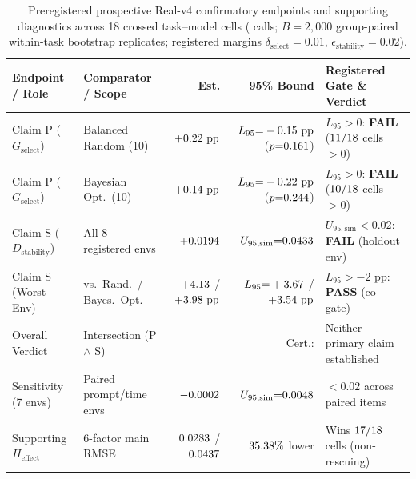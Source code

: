 \documentclass[11pt,a4paper]{article}
\begin{document}
\begin{table}[!ht]
\centering
\scriptsize
\setlength{\tabcolsep}{3.4pt}
\caption{Preregistered prospective Real-v4 confirmatory endpoints and supporting diagnostics across 18 crossed task--model cells (\RealVFourTotalCalls{} calls; $B=2{,}000$ group-paired within-task bootstrap replicates; registered margins $\delta_{\mathrm{select}}=0.01$, $\epsilon_{\mathrm{stability}}=0.02$).}
\label{tab:prospective_v4}
\begin{tabularx}{\textwidth}{@{}llrr>{\raggedright\arraybackslash}X@{}}
\toprule
\textbf{Endpoint / Role} & \textbf{Comparator / Scope} & \textbf{Est.} & \textbf{95\% Bound} & \textbf{Registered Gate \& Verdict} \\
\midrule
Claim P ($G_{\mathrm{select}}$) & Balanced Random (10) & $+0.22{}\text{ pp}$ & $L_{95}{=}-0.15{}\text{ pp}$ ($p{=}0.161{}$) & $L_{95}>0$: \textbf{FAIL} ($11{}/18$ cells $>0$) \\
Claim P ($G_{\mathrm{select}}$) & Bayesian Opt.\ (10) & $+0.14{}\text{ pp}$ & $L_{95}{=}-0.22{}\text{ pp}$ ($p{=}0.244{}$) & $L_{95}>0$: \textbf{FAIL} ($10{}/18$ cells $>0$) \\
Claim S ($D_{\mathrm{stability}}$) & All 8 registered envs & $+0.0194{}$ & $U_{95,\mathrm{sim}}{=}0.0433{}$ & $U_{95,\mathrm{sim}}<0.02$: \textbf{FAIL} (holdout env) \\
Claim S (Worst-Env) & vs.\ Rand.\ / Bayes.\ Opt. & $+4.13{}$ / $+3.98{}\text{ pp}$ & $L_{95}{=}+3.67{}$ / $+3.54{}\text{ pp}$ & $L_{95}>-2\text{ pp}$: \textbf{PASS} (co-gate) \\
Overall Verdict & Intersection (P $\land$ S) & \RealVFourVerdictCode{} & Cert.: \RealVFourCertStatus{} & Neither primary claim established \\
\midrule
Sensitivity (7 envs) & Paired prompt/time envs & $-0.0002{}$ & $U_{95,\mathrm{sim}}{=}0.0048{}$ & $<0.02$ across paired items \\
Supporting $H_{\mathrm{effect}}$ & 6-factor main RMSE & $0.0283{}$ / $0.0437{}$ & $35.38\%{}$ lower & Wins $17{}/18$ cells (non-rescuing) \\
\bottomrule
\end{tabularx}
\end{table}
\end{document}
